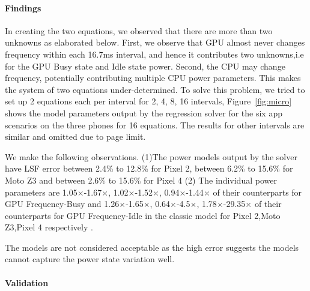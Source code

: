 \paragraph{Findings}
In creating the two equations, we observed that there are more than two unknowns as elaborated below.
First, we observe that GPU almost never changes frequency within each 16.7ms interval,
and hence it contributes two unknowns,i.e for the GPU Busy state and Idle state power.
Second, the CPU may change frequency, potentially contributing multiple CPU power parameters.
This makes the system of two equations under-determined.
%
To solve this problem, we tried to set up 2 equations 
each per interval for 2, 4, 8, 16 intervals,
%
% 
Figure~\ref{fig:micro} shows the model parameters output by the regression solver for the six app scenarios on the three phones for 16 equations. The results for other 
intervals are similar and omitted due to page limit. 

We make the following observations.
(1)The power models output by the solver have LSF error
between 2.4\% to 12.8\% for Pixel 2, between 6.2\% to 15.6\% for Moto Z3 and between 2.6\% to 15.6\% for Pixel 4
(2) The individual power parameters are 1.05$\times$-1.67$\times$, 1.02$\times$-1.52$\times$, 0.94$\times$-1.44$\times$ of their counterparts  for GPU Frequency-Busy and  1.26$\times$-1.65$\times$, 0.64$\times$-4.5$\times$, 1.78$\times$-29.35$\times$ of their counterparts for GPU Frequency-Idle in the classic model for Pixel 2,Moto Z3,Pixel 4 respectively . 

The models are not considered acceptable as the high error suggests the models cannot capture the power state variation well. 

\paragraph{Validation}

